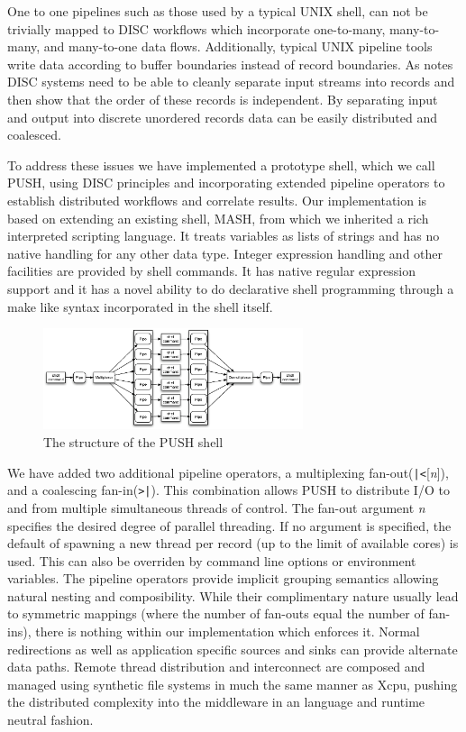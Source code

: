 \documentclass{sig-alt-release2}
\begin{document}
One to one pipelines such as those used by a typical UNIX shell, can not be 
trivially mapped to DISC workflows which incorporate one-to-many, many-to-many,
and many-to-one data flows. 
Additionally, typical UNIX pipeline tools write data according to buffer 
boundaries instead of record boundaries.
As \cite{pike2005idp} notes DISC systems need to be able to cleanly separate 
input streams into records and then show that the order of these records is 
independent. 
By separating input and output into discrete unordered records data can be 
easily distributed and coalesced.

To address these issues we have implemented a prototype shell, 
which we call PUSH, using DISC principles and incorporating extended 
pipeline operators to establish distributed workflows and correlate results.
Our implementation is based on extending an existing shell, MASH, 
from which we inherited a rich interpreted scripting language. 
It treats variables as lists of strings and has no native handling for any 
other data type. 
Integer expression handling and other facilities are provided by shell commands. 
It has native regular expression support and it has a novel ability to do 
declarative shell programming through a make like syntax incorporated in the 
shell itself.

\begin{figure}[htp]
\centering
\includegraphics[width=3in]{pipestruct.eps}
\caption{The structure of the PUSH shell}
\label{fig:pipestruct} 
\end{figure}

We have added two additional pipeline operators, 
a multiplexing fan-out(\verb!|<![\emph{n}]), and a coalescing fan-in(\verb!>|!). 
This combination allows PUSH to distribute I/O to and from multiple
simultaneous threads of control.
The fan-out argument \emph{n} specifies the desired degree of parallel 
threading.  If no argument is specified, the default of spawning a new
thread per record (up to the limit of available cores) is used.  This can
also be overriden by command line options or environment variables.
The pipeline operators provide implicit grouping semantics allowing natural 
nesting and composibility.
While their complimentary nature usually lead to symmetric
mappings (where the number of fan-outs equal the number of fan-ins), there is 
nothing within our implementation which enforces it.
Normal redirections as well as application specific sources and sinks 
can provide alternate data paths.
Remote thread distribution and interconnect are composed and managed
using synthetic file systems in much the same manner as Xcpu, 
pushing the distributed complexity into the middleware in an language and 
runtime neutral fashion.
\end{document}
